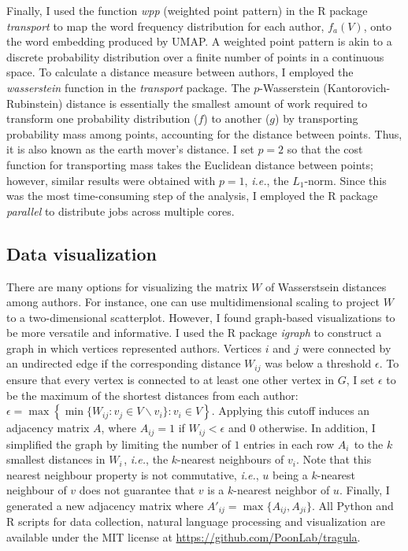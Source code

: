\documentclass[12pt]{article}
\makeatletter
\newcommand{\smallbullet}{} %
\DeclareRobustCommand\smallbullet{%
  \mathord{\mathpalette\smallbullet@{0.5}}%
}
\newcommand{\smallbullet@}[2]{%
  \vcenter{\hbox{\scalebox{#2}{$\m@th#1\bullet$}}}%
}
\makeatother
\begin{document}
Finally, I used the function \textit{wpp} (weighted point pattern) in the R package \textit{transport} \citep{schuhmacher2024transport} to map the word frequency distribution for each author, $f_a(V)$, onto the word embedding produced by UMAP.
A weighted point pattern is akin to a discrete probability distribution over a finite number of points in a continuous space.
To calculate a distance measure between authors, I employed the \textit{wasserstein} function in the \textit{transport} package.
The $p$-Wasserstein (Kantorovich-Rubinstein) distance \citep{panaretos2019statistical} is essentially the smallest amount of work required to transform one probability distribution ($f$) to another ($g$) by transporting probability mass among points, accounting for the distance between points.
Thus, it is also known as the earth mover's distance.
I set $p=2$ so that the cost function for transporting mass takes the Euclidean distance between points; however, similar results were obtained with $p=1$, \textit{i.e.}, the $L_1$-norm.
Since this was the most time-consuming step of the analysis, I employed the R package \textit{parallel} to distribute jobs across multiple cores.


\subsection * {Data visualization}

There are many options for visualizing the matrix $W$ of Wasserstsein distances among authors.
For instance, one can use multidimensional scaling to project $W$ to a two-dimensional scatterplot.
However, I found graph-based visualizations to be more versatile and informative.
I used the R package \textit{igraph} \citep{gabor2025igraph} to construct a graph in which vertices represented authors.
Vertices $i$ and $j$ were connected by an undirected edge if the corresponding distance $W_{ij}$ was below a threshold $\epsilon$.
To ensure that every vertex is connected to at least one other vertex in $G$, I set $\epsilon$ to be the maximum of the shortest distances from each author: 
$\epsilon = \max\left\{\min\{W_{ij}: v_j \in V\backslash v_i\}: v_i \in V\right\}$.
Applying this cutoff induces an adjacency matrix $A$, where
$A_{ij} = 1$ if $W_{ij} < \epsilon$ and $0$ otherwise.
In addition, I simplified the graph by limiting the number of $1$ entries in each row $A_{i\,\smallbullet}$ to the $k$ smallest distances in $W_{i\,\smallbullet}$, \textit{i.e.}, the $k$-nearest neighbours of $v_i$.
Note that this nearest neighbour property is not commutative, \textit{i.e.}, $u$ being a $k$-nearest neighbour of $v$ does not guarantee that $v$ is a $k$-nearest neighbor of $u$.
Finally, I generated a new adjacency matrix where $A'_{ij}=\max\{A_{ij}, A_{ji}\}$.
All Python and R scripts for data collection, natural language processing and visualization are available under the MIT license at \url{https://github.com/PoonLab/tragula}.
\end{document}
